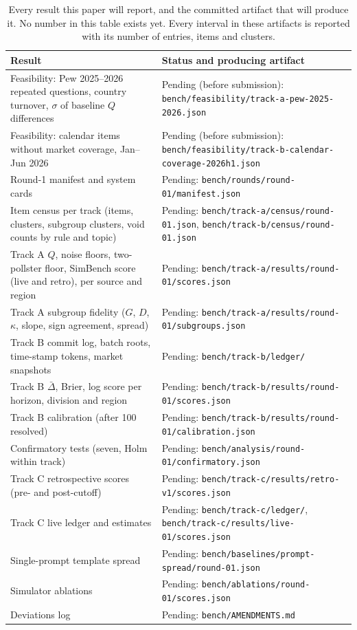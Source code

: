 \documentclass[11pt]{article}
\begin{document}
\begin{table}[t]
\centering
\small
\begin{tabular}{@{}L{5.6cm}L{8.6cm}@{}}
\toprule
\textbf{Result} & \textbf{Status and producing artifact} \\
\midrule
Feasibility: Pew 2025--2026 repeated questions, country turnover, $\sigma$ of baseline $Q$ differences & Pending (before submission): \nolinkurl{bench/feasibility/track-a-pew-2025-2026.json} \\
Feasibility: calendar items without market coverage, Jan--Jun 2026 & Pending (before submission): \nolinkurl{bench/feasibility/track-b-calendar-coverage-2026h1.json} \\
Round-1 manifest and system cards & Pending: \nolinkurl{bench/rounds/round-01/manifest.json} \\
Item census per track (items, clusters, subgroup clusters, void counts by rule and topic) & Pending: \nolinkurl{bench/track-a/census/round-01.json}, \nolinkurl{bench/track-b/census/round-01.json} \\
Track A $Q$, noise floors, two-pollster floor, SimBench score (live and retro), per source and region & Pending: \nolinkurl{bench/track-a/results/round-01/scores.json} \\
Track A subgroup fidelity ($G$, $D$, $\kappa$, slope, sign agreement, spread) & Pending: \nolinkurl{bench/track-a/results/round-01/subgroups.json} \\
Track B commit log, batch roots, time-stamp tokens, market snapshots & Pending: \nolinkurl{bench/track-b/ledger/} \\
Track B $\bar\Delta$, Brier, log score per horizon, division and region & Pending: \nolinkurl{bench/track-b/results/round-01/scores.json} \\
Track B calibration (after 100 resolved) & Pending: \nolinkurl{bench/track-b/results/round-01/calibration.json} \\
Confirmatory tests (seven, Holm within track) & Pending: \nolinkurl{bench/analysis/round-01/confirmatory.json} \\
Track C retrospective scores (pre- and post-cutoff) & Pending: \nolinkurl{bench/track-c/results/retro-v1/scores.json} \\
Track C live ledger and estimates & Pending: \nolinkurl{bench/track-c/ledger/}, \nolinkurl{bench/track-c/results/live-01/scores.json} \\
Single-prompt template spread & Pending: \nolinkurl{bench/baselines/prompt-spread/round-01.json} \\
Simulator ablations & Pending: \nolinkurl{bench/ablations/round-01/scores.json} \\
Deviations log & Pending: \nolinkurl{bench/AMENDMENTS.md} \\
\bottomrule
\end{tabular}
\caption{Every result this paper will report, and the committed artifact that will produce it. No number in this table exists yet. Every interval in these artifacts is reported with its number of entries, items and clusters.}
\label{tab:pending}
\end{table}
\end{document}
